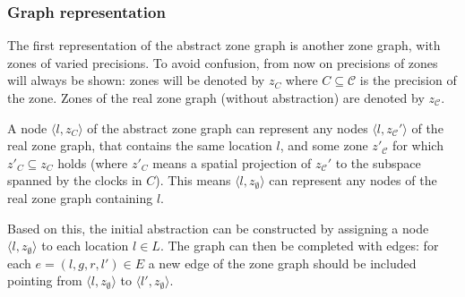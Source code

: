 \begin{runningExample}



\subsubsection{Graph representation}

The first representation of the abstract zone graph is another zone graph, with zones of varied precisions. To avoid confusion, from now on precisions of zones will always be shown: zones will be denoted by $z_{C}$ where $C \subseteq \mathcal{C}$ is the precision of the zone. Zones of the real zone graph (without abstraction) are denoted by $z_{\mathcal{C}}$.

A node $\langle l, z_{C} \rangle$ of the abstract zone graph can represent any nodes $\langle l, z_{\mathcal{C}}' \rangle$ of the real zone graph, that contains the same location $l$, and some zone $z'_{\mathcal{C}}$ for which $z'_C \subseteq z_C$ holds (where $z'_C$ means a spatial projection of $z_{\mathcal{C}}'$ to the subspace spanned by the clocks in $C$). This means $\langle l, z_{\emptyset} \rangle$ can represent any nodes of the real zone graph containing $l$. 

Based on this, the initial abstraction can be constructed by assigning a node $\langle l, z_{\emptyset} \rangle$ to each location $l \in L$. The graph can then be completed with edges: for each $e=(l,g,r,l') \in E$ a new edge of the zone graph should be included pointing from $\langle l, z_{\emptyset} \rangle$ to $\langle l', z_{\emptyset} \rangle$.


\end{runningExample}
